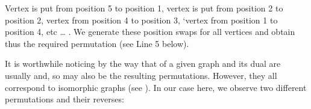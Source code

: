 \documentclass[a4paper,12pt,english]{sphinxhowto}
\begin{document}
\begin{sphinxVerbatim}[commandchars=\\\{\},numbers=left,firstnumber=1,stepnumber=1]
  
  
\end{sphinxVerbatim}

Vertex  is put from position 5 to position 1, vertex  is put from position 2 to position 2, vertex  from position 4 to position 3, ‘vertex  from position 1 to position 4, etc … . We generate these position swaps for all vertices and obtain thus the required permutation (see Line 5 below).

\begin{sphinxVerbatim}[commandchars=\\\{\},numbers=left,firstnumber=1,stepnumber=1]
  \PYG{p}{[}    \PYG{p}{]}
   
\end{sphinxVerbatim}

It is worthwhile noticing by the way that  of a given graph and its dual are usually  and, so may also be the resulting permutations. However, they all correspond to isomorphic graphs (see ). In our case here, we observe two different permutations and their reverses:
\end{document}
